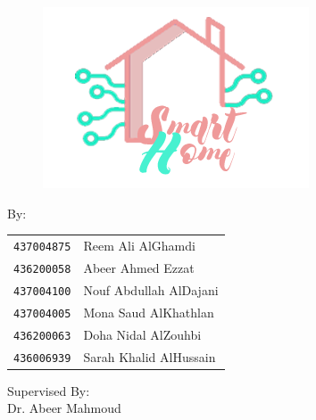 \documentclass[12pt, oneside, a4paper]{book}
\begin{document}
	

	\begin{titlepage}
	\begin{center}
		\hspace{0pt}\\
		\vspace{3cm}
		{}\\			
			\begin{figure}[H]
				\centering
				\includegraphics{img/logo.png}
			\end{figure}
			By: \\
			\begin{table}[H]
				\begin{center}
					\begin{tabular}{rl}	
						\texttt{437004875} & Reem Ali AlGhamdi	
						\\
						\texttt{436200058} & Abeer Ahmed Ezzat 
						\\
						\texttt{437004100} & Nouf Abdullah AlDajani 
						\\	
						\texttt{437004005} & Mona Saud AlKhathlan  
						\\
						\texttt{436200063} & Doha Nidal AlZouhbi
						\\
						\texttt{436006939} & Sarah Khalid AlHussain 
					\end{tabular}
				\end{center}
			\end{table}
			
			Supervised By: \\
			\Large{Dr. Abeer Mahmoud}\\
			
			
			

\end{center}
\end{titlepage}
\end{document}
